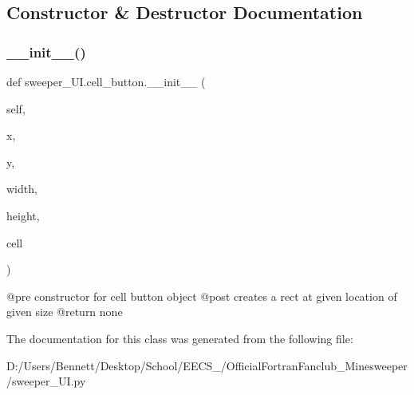 \subsection{Constructor \& Destructor Documentation}
\mbox{\label{classsweeper___u_i_1_1cell__button_a331ff79c7f93f68d677c7b6aaafbc23a}} 
\subsubsection{\texorpdfstring{\+\_\+\+\_\+init\+\_\+\+\_\+()}{\_\_init\_\_()}}
{\footnotesize\ttfamily def sweeper\+\_\+\+U\+I.\+cell\+\_\+button.\+\_\+\+\_\+init\+\_\+\+\_\+ (\begin{DoxyParamCaption}\item[{}]{self,  }\item[{}]{x,  }\item[{}]{y,  }\item[{}]{width,  }\item[{}]{height,  }\item[{}]{cell }\end{DoxyParamCaption})}

\begin{DoxyVerb}@pre constructor for cell button object
@post creates a rect at given location of given size
@return none
\end{DoxyVerb}
 

The documentation for this class was generated from the following file\+:\begin{DoxyCompactItemize}
\item 
D\+:/\+Users/\+Bennett/\+Desktop/\+School/\+E\+E\+C\+S\+\_/\+Official\+Fortran\+Fanclub\+\_\+\+Minesweeper/sweeper\+\_\+\+U\+I.\+py\end{DoxyCompactItemize}
